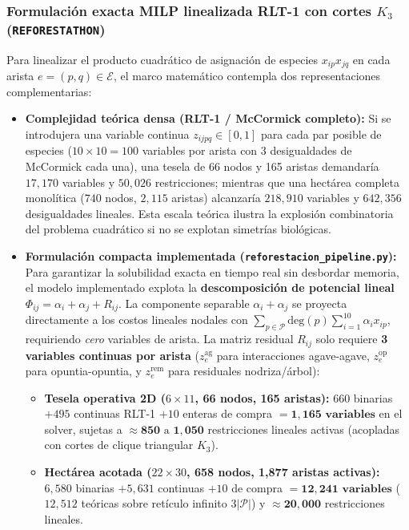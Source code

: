 \documentclass[11pt,a4paper]{article}
\begin{document}
\subsubsection{Formulación exacta MILP linealizada RLT-1 con cortes $K_3$ (\texttt{REFORESTATHON})}
Para linealizar el producto cuadrático de asignación de especies $x_{ip}x_{jq}$ en cada arista $e=(p,q) \in \mathcal{E}$, el marco matemático contempla dos representaciones complementarias:
\begin{itemize}[leftmargin=1.5em]
    \item \textbf{Complejidad teórica densa (RLT-1 / McCormick completo):} Si se introdujera una variable continua $z_{ijpq} \in [0, 1]$ para cada par posible de especies ($10 \times 10 = 100$ variables por arista con 3 desigualdades de McCormick cada una), una tesela de 66 nodos y 165 aristas demandaría $17,170$ variables y $50,026$ restricciones; mientras que una hectárea completa monolítica ($740$ nodos, $2,115$ aristas) alcanzaría $218,910$ variables y $642,356$ desigualdades lineales. Esta escala teórica ilustra la explosión combinatoria del problema cuadrático si no se explotan simetrías biológicas.
    \item \textbf{Formulación compacta implementada (\texttt{reforestacion\_pipeline.py}):} Para garantizar la solubilidad exacta en tiempo real sin desbordar memoria, el modelo implementado explota la \textbf{descomposición de potencial lineal} $\Phi_{ij} = \alpha_i + \alpha_j + R_{ij}$. La componente separable $\alpha_i + \alpha_j$ se proyecta directamente a los costos lineales nodales con $\sum_{p \in \mathcal{P}} \text{deg}(p) \sum_{i=1}^{10} \alpha_i x_{ip}$, requiriendo \textit{cero} variables de arista. La matriz residual $R_{ij}$ solo requiere \textbf{3 variables continuas por arista} ($z_e^{\text{ag}}$ para interacciones agave-agave, $z_e^{\text{op}}$ para opuntia-opuntia, y $z_e^{\text{rem}}$ para residuales nodriza/árbol):
    \begin{itemize}
        \item \textbf{Tesela operativa 2D ($6\times 11$, 66 nodos, 165 aristas):} $660$ binarias $+ 495$ continuas RLT-1 $+ 10$ enteras de compra $= \mathbf{1,165\text{ variables}}$ en el solver, sujetas a $\approx \mathbf{850}\text{ a }\mathbf{1,050}$ restricciones lineales activas (acopladas con cortes de clique triangular $K_3$).
        \item \textbf{Hectárea acotada ($22\times 30$, 658 nodos, 1,877 aristas activas):} $6,580$ binarias $+ 5,631$ continuas $+ 10$ de compra $= \mathbf{12,241\text{ variables}}$ ($12,512$ teóricas sobre retículo infinito $3|\mathcal{P}|$) y $\approx \mathbf{20,000}$ restricciones lineales.
    \end{itemize}
\end{itemize}
\end{document}
